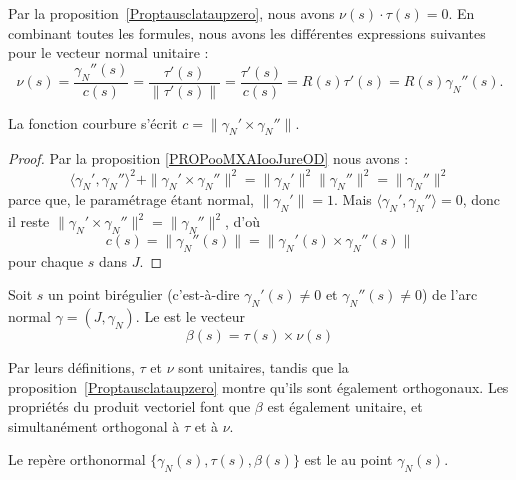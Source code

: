Par la proposition~\ref{Proptausclataupzero}, nous avons \( \nu(s)\cdot\tau(s)=0\). En combinant toutes les formules, nous avons les différentes expressions suivantes pour le vecteur normal unitaire :
\begin{equation}        \label{Eq0908nufractauRc}
	\nu(s)=\frac{ \gamma_N''(s) }{ c(s) }=\frac{ \tau'(s) }{ \| \tau'(s) \| }=\frac{ \tau'(s) }{ c(s) }=R(s)\tau'(s)=R(s)\gamma_N''(s).
\end{equation}

\begin{proposition}
	La fonction courbure s'écrit \( c=\| \gamma_N'\times \gamma_N'' \|\).
\end{proposition}

\begin{proof}
	Par la proposition \ref{PROPooMXAIooJureOD} nous avons :
	\begin{equation}
		\langle \gamma_N', \gamma_N''\rangle^2 + \| \gamma_N'\times \gamma_N'' \|^2=\| \gamma_N' \|^2\| \gamma_N'' \|^2=\| \gamma_N'' \|^2
	\end{equation}
	parce que, le paramétrage étant normal, \( \| \gamma_N' \|=1\). Mais \( \langle \gamma_N', \gamma_N''\rangle =0\), donc il reste \( \| \gamma_N'\times \gamma_N'' \|^2=\| \gamma_N'' \|^2\), d'où
	\begin{equation}        \label{Eqcsnormgpgpps}
		c(s)=\| \gamma_N''(s) \|=\| \gamma_N'(s)\times \gamma_N''(s) \|
	\end{equation}
	pour chaque \( s\) dans \( J\).
\end{proof}

\begin{definition}
	Soit \( s\) un point birégulier (c'est-à-dire \( \gamma_N'(s)\neq 0\) et \( \gamma_N''(s)\neq 0\)) de l'arc normal \( \gamma=(J,\gamma_N)\). Le  est le vecteur
	\begin{equation}
		\beta(s)=\tau(s)\times\nu(s)
	\end{equation}
\end{definition}

Par leurs définitions, \( \tau\) et \( \nu\) sont unitaires, tandis que la proposition~\ref{Proptausclataupzero} montre qu'ils sont également orthogonaux. Les propriétés du produit vectoriel font que \( \beta\) est également unitaire, et simultanément orthogonal à \( \tau\) et à \( \nu\).

\begin{definition}
	Le repère orthonormal \( \{ \gamma_N(s),\tau(s),\beta(s) \}\) est le  au point \( \gamma_N(s)\).
\end{definition}


